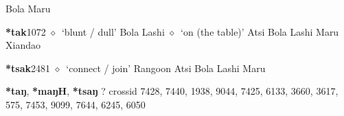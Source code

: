 \begin{list}{}{\leftmargin=1.5em \itemindent=-1.5em}
         Bola 
\hspace{1ex}
         Maru 
  \item {\footnotesize \textbf{*tak}}{\tiny 1072}
\hspace{1ex}
         $\diamond$~`blunt / dull'
         Bola 
\hspace{1ex}
         Lashi 
\hspace{1ex}
         $\diamond$~`on (the table)'
         Atsi 
\hspace{1ex}
         Bola 
\hspace{1ex}
         Lashi 
\hspace{1ex}
         Maru 
\hspace{1ex}
         Xiandao 
  \item {\footnotesize \textbf{*tsak}}{\tiny 2481}
\hspace{1ex}
         $\diamond$~`connect / join'
         Rangoon 
\hspace{1ex}
         Atsi 
\hspace{1ex}
         Bola 
\hspace{1ex}
         Lashi 
\hspace{1ex}
         Maru 
  \end{list}
\item
\textbf{*taŋ}, \textbf{*maŋH}, \textbf{*tsaŋ}
?
  {\tiny crossid 7428, 7440, 1938, 9044, 7425, 6133, 3660, 3617, 575, 7453, 9099, 7644, 6245, 6050}
